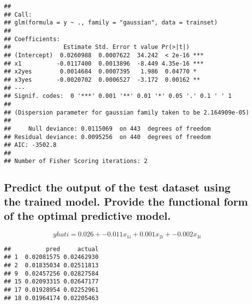 \documentclass[
]{article}
\newenvironment{Shaded}{\begin{snugshade}}{\end{snugshade}}
\newcommand{\CommentTok}[1]{\textcolor[rgb]{0.56,0.35,0.01}{\textit{#1}}}
\newcommand{\FunctionTok}[1]{\textcolor[rgb]{0.00,0.00,0.00}{#1}}
\newcommand{\NormalTok}[1]{#1}
\newcommand{\OtherTok}[1]{\textcolor[rgb]{0.56,0.35,0.01}{#1}}
\newcommand{\SpecialCharTok}[1]{\textcolor[rgb]{0.00,0.00,0.00}{#1}}
\begin{document}
\begin{verbatim}
## 
## Call:
## glm(formula = y ~ ., family = "gaussian", data = trainset)
## 
## Coefficients:
##               Estimate Std. Error t value Pr(>|t|)    
## (Intercept)  0.0260988  0.0007622  34.242  < 2e-16 ***
## x1          -0.0117400  0.0013896  -8.449 4.35e-16 ***
## x2yes        0.0014684  0.0007395   1.986  0.04770 *  
## x3yes       -0.0020702  0.0006527  -3.172  0.00162 ** 
## ---
## Signif. codes:  0 '***' 0.001 '**' 0.01 '*' 0.05 '.' 0.1 ' ' 1
## 
## (Dispersion parameter for gaussian family taken to be 2.164909e-05)
## 
##     Null deviance: 0.0115069  on 443  degrees of freedom
## Residual deviance: 0.0095256  on 440  degrees of freedom
## AIC: -3502.8
## 
## Number of Fisher Scoring iterations: 2
\end{verbatim}

\hypertarget{predict-the-output-of-the-test-dataset-using-the-trained-model.-provide-the-functional-form-of-the-optimal-predictive-model.}{%
\subsection{Predict the output of the test dataset using the trained
model. Provide the functional form of the optimal predictive
model.}\label{predict-the-output-of-the-test-dataset-using-the-trained-model.-provide-the-functional-form-of-the-optimal-predictive-model.}}

\[yhati=0.026+-0.011x_{1i}+0.001x_{2i}+-0.002x_{3i}\]

\begin{Shaded}
\end{Shaded}

\begin{verbatim}
##          pred     actual
## 1  0.02081575 0.02462930
## 2  0.01835034 0.02511813
## 9  0.02457256 0.02827584
## 15 0.02093315 0.02647177
## 17 0.01928954 0.02252961
## 18 0.01964174 0.02205463
\end{verbatim}
\end{document}
